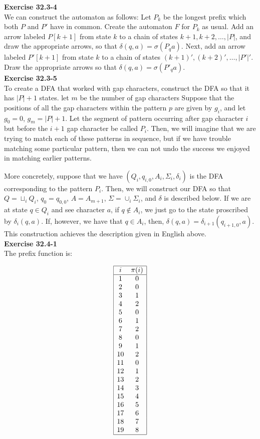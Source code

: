 \documentclass{article}
\begin{document}
\noindent\textbf{Exercise 32.3-4}\\

We can construct the automaton as follows: Let $P_k$ be the longest prefix which both $P$ and $P'$ have in common.  Create the automaton $F$ for $P_k$ as usual. Add an arrow labeled $P[k+1]$ from state $k$ to a chain of states $k+1, k+2, \ldots, |P|$, and draw the appropriate arrows, so that $\delta(q,a) = \sigma(P_q a)$.  Next, add an arrow labeled $P'[k+1]$ from state $k$ to a chain of states $(k+1)', (k+2)', \ldots, |P'|'$. Draw the appropriate arrows so that $\delta(q,a) = \sigma(P'_qa)$. \\

\noindent\textbf{Exercise 32.3-5}\\

To create a DFA that worked with gap characters, construct the DFA so that it has $|P|+1$ states. let $m$ be the number of gap characters Suppose that the positions of all the gap characters within the pattern $p$ are given by $g_i$, and let $g_0=0$, $g_m = |P|+1$. Let the segment of pattern occurring after gap character $i$ but before the $i+1$ gap character be called $P_i$. Then, we will imagine that we are trying to match each of these patterns in sequence, but if we have trouble matching some particular pattern, then we can not undo the success we enjoyed in matching earlier patterns. 

More concretely, suppose that we have $(Q_i,q_{i,0},A_i,\Sigma_i,\delta_i)$ is the DFA corresponding to the pattern $P_i$. Then, we will construct our DFA so that $Q = \sqcup_i Q_i$, $q_0 = q_{0,0}$, $A = A_{m+1}$, $\Sigma = \cup_i \Sigma_i$, and $\delta$ is described below. If we are at state $q\in Q_i$ and see character $a$, if $q\not\in A_i$, we just go to the state proscribed by $\delta_i(q,a)$. If, however, we have that $q \in A_i$, then, $\delta(q,a) = \delta_{i+1}(q_{i+1,0},a)$. This construction achieves the description given in English above.\\


\noindent\textbf{Exercise 32.4-1}\\

The prefix function is:

\[
\begin{array}{|cc|}
\hline
i &\pi(i)\\
\hline
1&0\\
2&0\\
3&1\\
4&2\\
5&0\\
6&1\\
7&2\\
8&0\\
9&1\\
10&2\\
11&0\\
12&1\\
13&2\\
14&3\\
15&4\\
16&5\\
17&6\\
18&7\\
19&8\\
\hline
\end{array}
\]
\end{document}
